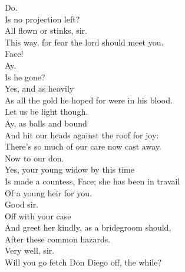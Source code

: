 \documentclass[a4paper,oneside,12pt]{memoir}
\begin{document}
\begin{drama*}
\mammonspeaks {} Do.\\
Is no projection left?\\
\facespeaks {} All flown or stinks, sir.\\
This way, for fear the lord should meet you.\\
\subtlespeaks {}  Face!\\
\facespeaks Ay.\\
\subtlespeaks {} Is he gone?\\
\facespeaks {} Yes, and as heavily\\
As all the gold he hoped for were in his blood.\\
Let us be light though.\\
\subtlespeaks {}  Ay, as balls and bound\\
And hit our heads against the roof for joy:\\
There's so much of our care now cast away.\\
\facespeaks Now to our don.\\
\subtlespeaks {} Yes, your young widow by this time\\
Is made a countess, Face; she has been in travail\\
Of a young heir for you.\\
\facespeaks {} Good sir.\\
\subtlespeaks {} Off with your case\\
And greet her kindly, as a bridegroom should,\\
After these common hazards.\\
\facespeaks {} Very well, sir.\\
Will you go fetch Don Diego off, the while?\\
\scene


\end{drama*}
\end{document}

